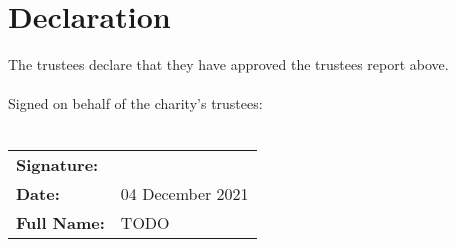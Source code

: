 \documentclass[11pt, final]{article}
\begin{document}
    \section{Declaration}
    The trustees declare that they have approved the trustees report above.\\
    \\
    Signed on behalf of the charity's trustees:\\
    \\
    \begin{tabular}{l l}
        \textbf{Signature:}\vspace{2cm}\\
        \textbf{Date:} & 04 December 2021\vspace{1cm}\\
        \textbf{Full Name:} & TODO \\
    \end{tabular}
\end{document}
